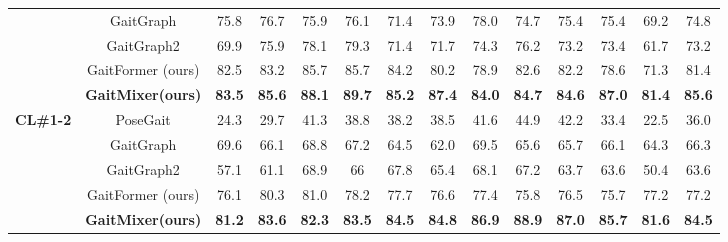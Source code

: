 \documentclass{article}
\begin{document}
\begin{table*}[h]
{\begin{tabular}{c|c|c|c|c|c|c|c|c|c|c|c|c|c}
                                  & GaitGraph    \cite{GaitGraph}            & 75.8          & 76.7          & 75.9          & 76.1          & 71.4          & 73.9          & 78.0          & 74.7          & 75.4          & 75.4          & 69.2          & 74.8           \\
                                  & GaitGraph2 \cite{GaitGraph2}              & 69.9          & 75.9          & 78.1          & 79.3          & 71.4          & 71.7          & 74.3          & 76.2          & 73.2          & 73.4          & 61.7          & 73.2                                \\
                                  & GaitFormer (ours) & 82.5          & 83.2          & 85.7          & 85.7          & 84.2          & 80.2          & 78.9          & 82.6          & 82.2          & 78.6          & 71.3          & 81.4           \\ 
\cline{2-14}
                                  & \textbf{GaitMixer(ours)} & \textbf{83.5} & \textbf{85.6} & \textbf{88.1} & \textbf{89.7} & \textbf{85.2} & \textbf{87.4} & \textbf{84.0}          & \textbf{84.7} & \textbf{84.6} & \textbf{87.0} & \textbf{81.4} & \textbf{85.6}  \\ 
\hline
\multirow{4}{*}{\textbf{CL\#1-2}} & PoseGait  \cite{PoseGait}               & 24.3          & 29.7          & 41.3          & 38.8          & 38.2          & 38.5          & 41.6          & 44.9          & 42.2          & 33.4          & 22.5          & 36.0           \\
                                  & GaitGraph \cite{GaitGraph}               & 69.6          & 66.1          & 68.8          & 67.2          & 64.5          & 62.0          & 69.5          & 65.6          & 65.7          & 66.1          & 64.3          & 66.3           \\
                                  & GaitGraph2  \cite{GaitGraph2}             & 57.1          & 61.1          & 68.9          & 66            & 67.8          & 65.4          & 68.1          & 67.2          & 63.7          & 63.6          & 50.4          & 63.6                                \\
                                  & GaitFormer (ours) & 76.1          & 80.3          & 81.0          & 78.2          & 77.7          & 76.6          & 77.4          & 75.8          & 76.5          & 75.7          & 77.2          & 77.2           \\ 
\cline{2-14}
                                  & \textbf{GaitMixer(ours)} & \textbf{81.2} & \textbf{83.6} & \textbf{82.3} & \textbf{83.5} & \textbf{84.5} & \textbf{84.8} & \textbf{86.9} & \textbf{88.9} & \textbf{87.0} & \textbf{85.7} & \textbf{81.6} & \textbf{84.5}  \\
\hline
\end{tabular}
}
\label{tab:skeleton-based}
\end{table*}
\end{document}
